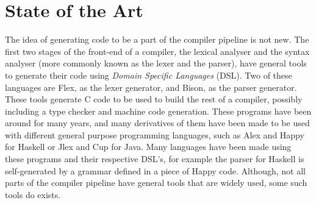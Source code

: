 \chapter{State of the Art}
\label{chap:sota}
The idea of generating code to be a part of the compiler pipeline is not new.
The first two stages of the front-end of a compiler, the lexical analyser and the syntax analyser (more commonly known as the lexer and the parser), have general tools to generate their code using \textit{Domain Specific Languages} (DSL)\cite{Bentley:1986:PPL:6424.315691,van2000domain}.
Two of these languages are Flex\cite{Levine:2009:FB:1696439}, as the lexer generator, and Bison\cite{Levine:2009:FB:1696439}, as the parser generator.
These tools generate C code to be used to build the rest of a compiler, possibly including a type checker and machine code generation.
These programs have been around for many years, and many derivatives of them have been made to be used with different general purpose programming languages, such as Alex and Happy for Haskell or Jlex and Cup for Java\cite{ranta2012implementing}.
Many languages have been made using these programs and their respective DSL's, for example the parser for Haskell is self-generated by a grammar defined in a piece of Happy code.
Although, not all parts of the compiler pipeline have general tools that are widely used, some such tools do exists\cite{grimm2007typical,dijkstra2006ruler,Gray:1992:ECF:129630.129637}.

%

